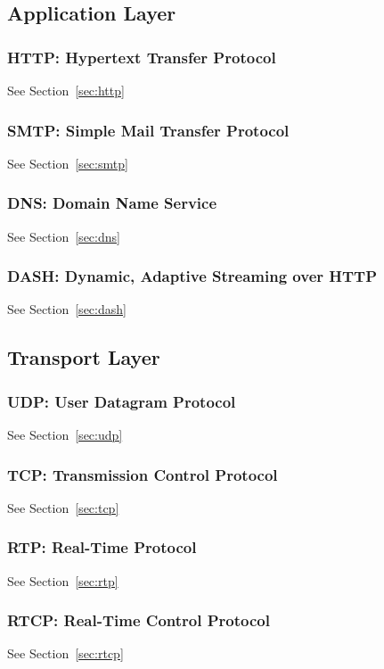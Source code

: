 \subsection{Application Layer}
\subsubsection{HTTP: Hypertext Transfer Protocol}
See Section~\ref{sec:http}
\subsubsection{SMTP: Simple Mail Transfer Protocol}
See Section~\ref{sec:smtp}
\subsubsection{DNS: Domain Name Service}
See Section~\ref{sec:dns}
\subsubsection{DASH: Dynamic, Adaptive Streaming over HTTP}
See Section~\ref{sec:dash}


\subsection{Transport Layer}
\subsubsection{UDP: User Datagram Protocol}
See Section~\ref{sec:udp}
\subsubsection{TCP: Transmission Control Protocol}
See Section~\ref{sec:tcp}
\subsubsection{RTP: Real-Time Protocol}
See Section~\ref{sec:rtp}
\subsubsection{RTCP: Real-Time Control Protocol}
See Section~\ref{sec:rtcp}

